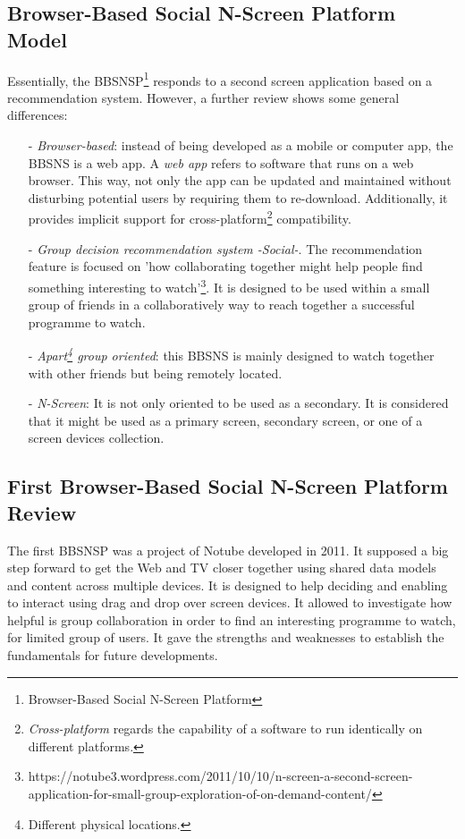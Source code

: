 \documentclass{acm_proc_article-sp}
\begin{document}
\subsection{Browser-Based Social N-Screen Platform Model}

Essentially, the BBSNSP\footnote{Browser-Based Social N-Screen Platform} responds to a second screen application based on a recommendation system. However, a further review shows some general differences:

\begin{itemize}
  	\item [-]\textit{Browser-based}: instead of being developed as a mobile or computer app, the BBSNS is a web app. A \textit{web app} refers to software that runs on a web browser. This way, not only the app can be updated and maintained without disturbing potential users by requiring them to re-download. Additionally, it provides implicit support for cross-platform\footnote{\textit{Cross-platform} regards the capability of a software to run identically on different platforms.} compatibility. 
	\item [-]\textit{Group decision recommendation system -Social-}. The recommendation feature is focused on 'how collaborating together might help people find something interesting to watch'\footnote{https://notube3.wordpress.com/2011/10/10/n-screen-a-second-screen-application-for-small-group-exploration-of-on-demand-content/}. It is designed to be used within a small group of friends in a collaboratively way to reach together a successful programme to watch. 
	\item [-]\textit{Apart\footnote{Different physical locations.} group oriented}: this BBSNS is mainly designed to watch together with other friends but being remotely located. 
	\item [-]\textit{N-Screen}: It is not only oriented to be used as a secondary. It is considered that it might be used as a primary screen, secondary screen, or one of a screen devices collection. 
\end{itemize}

\subsection{First Browser-Based Social N-Screen Platform Review} \label{firstNScreen}

The first BBSNSP was a project of Notube developed in 2011. It supposed a big step forward to get the Web and TV closer together using shared data models and content across multiple devices\cite{schopman2010notube}. It is designed to help deciding and enabling to interact using drag and drop over screen devices. It allowed to investigate  how helpful is group collaboration in order to find an interesting programme to watch, for limited group of users. It gave the strengths and weaknesses to establish the fundamentals for future developments.
\end{document}
